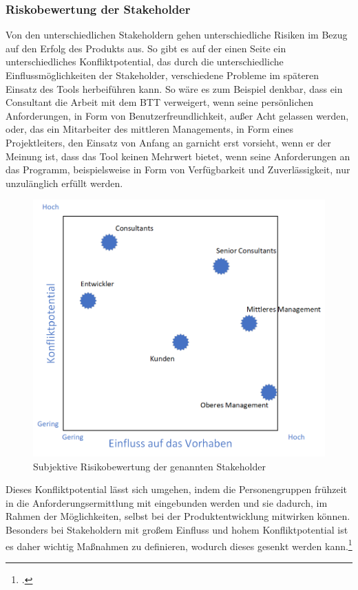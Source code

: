 \subsubsection{Riskobewertung der Stakeholder}
Von den unterschiedlichen Stakeholdern gehen unterschiedliche Risiken im Bezug auf den Erfolg des Produkts aus. So gibt es auf der einen Seite ein unterschiedliches Konfliktpotential, das durch die unterschiedliche Einflussmöglichkeiten der Stakeholder, verschiedene Probleme im späteren Einsatz des Tools herbeiführen kann. So wäre es zum Beispiel denkbar, dass ein Consultant die Arbeit mit dem BTT verweigert, wenn seine persönlichen Anforderungen, in Form von Benutzerfreundlichkeit, außer Acht gelassen werden, oder, das ein Mitarbeiter des mittleren Managements, in Form eines Projektleiters, den Einsatz von Anfang an garnicht erst vorsieht, wenn er der Meinung ist, dass das Tool keinen Mehrwert bietet, wenn seine Anforderungen an das Programm, beispielsweise in Form von Verfügbarkeit und Zuverlässigkeit, nur unzulänglich erfüllt werden.
\begin{figure}[ht]
    \centering
    \includegraphics[scale=0.67]{Bilder/stakeholderRisiko.png}
    \caption[Risikobewertung der Stakeholder]{Subjektive Risikobewertung der genannten Stakeholder}
\end{figure}
Dieses Konfliktpotential lässt sich umgehen, indem die Personengruppen frühzeit in die Anforderungsermittlung mit eingebunden werden und sie dadurch, im Rahmen der Möglichkeiten, selbst bei der Produktentwicklung mitwirken können. Besonders bei Stakeholdern mit großem Einfluss und hohem Konfliktpotential ist es daher wichtig Maßnahmen zu definieren, wodurch dieses gesenkt werden kann.\footcite[Vgl.][S. 504 f.]{balzert}

